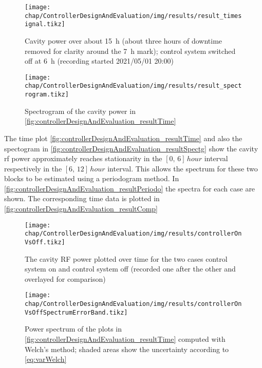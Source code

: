 \begin{figure}[tb]
	\centering
	\texttt{[image: chap/ControllerDesignAndEvaluation/img/results/result\_timesignal.tikz]}
	\caption[Time signal whole experiment]{Cavity power over about \SI{15}{\hour} (about three hours of downtime removed for clarity around the \SI{7}{\hour} mark); control system switched off at \SI{6}{\hour} (recording started 2021/05/01 20:00)}
	\label{fig:controllerDesignAndEvaluation_resultTime}
\end{figure}

\begin{figure}[tb]
	\centering
	\texttt{[image: chap/ControllerDesignAndEvaluation/img/results/result\_spectrogram.tikz]}
	\caption[Spectogram of \autoref{fig:controllerDesignAndEvaluation_resultTime}]{Spectrogram of the cavity power in \autoref{fig:controllerDesignAndEvaluation_resultTime}}
	\label{fig:controllerDesignAndEvaluation_resultSpectg}
\end{figure}

The time plot \autoref{fig:controllerDesignAndEvaluation_resultTime} and also the spectogram in \autoref{fig:controllerDesignAndEvaluation_resultSpectg} show the cavity \gls{rf} power approximately reaches stationarity in the $[0,\,6]\,\si{hour}$ interval respectively in the $[6,\,12]\, \si{hour}$ interval.
This allows the spectrum for these two blocks to be estimated using a periodogram method. In \autoref{fig:controllerDesignAndEvaluation_resultPeriodo} the spectra for each case are shown. The corresponding time data is plotted in \autoref{fig:controllerDesignAndEvaluation_resultComp}

\begin{figure}[tb]
	\centering
	\texttt{[image: chap/ControllerDesignAndEvaluation/img/results/controllerOnVsOff.tikz]}
	\caption[Controller success time signal]{The cavity RF power plotted over time for the two cases control system on and control system off (recorded one after the other and overlayed for comparison)}
	\label{fig:controllerDesignAndEvaluation_resultComp}
\end{figure}

\begin{figure}[tb]
	\centering
	\texttt{[image: chap/ControllerDesignAndEvaluation/img/results/controllerOnVsOffSpectrumErrorBand.tikz]}
	\caption[Controller success spectrum]{Power spectrum of the plots in \autoref{fig:controllerDesignAndEvaluation_resultTime} computed with Welch's method; shaded areas show the uncertainty according to \autoref{eq:varWelch}}
	\label{fig:controllerDesignAndEvaluation_resultPeriodo}
\end{figure}

